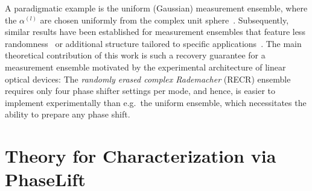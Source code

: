 A paradigmatic example is the uniform (Gaussian) measurement ensemble, where the $\alpha^{(l)}$ are chosen uniformly from the complex unit sphere~\cite{Candes_2013_Phaselift}.
Subsequently, similar results have been established for measurement ensembles that feature less randomness~\cite{gross_partial_2013,kueng_low_2014,kueng_low_2016} or additional structure tailored to specific applications~\cite{candes_phase_2015,gross_improved_2017,voroninski_quantum_2013,kueng_low_2015}.
The main theoretical contribution of this work is such a recovery guarantee for a measurement ensemble motivated by the experimental architecture of linear optical devices:
The \emph{randomly erased complex Rademacher} (RECR) ensemble requires only four phase shifter settings per mode, and hence, is easier to implement experimentally than e.g.\ the uniform ensemble, which necessitates the ability to prepare any phase shift.

\section{Theory for Characterization via PhaseLift}

